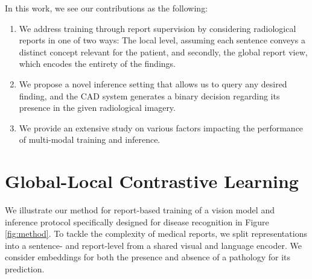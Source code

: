 \documentclass[runningheads]{llncs}
\begin{document}
In this work, we see our contributions as the following: 
\begin{enumerate}
    \item We address training through report supervision by considering radiological reports in one of two ways: The local level, assuming each sentence conveys a distinct concept relevant for the patient, and secondly, the global report view, which encodes the entirety of the findings.
    \item We propose a novel inference setting that allows us to query any desired finding, and the CAD system generates a binary decision regarding its presence in the given radiological imagery.
    \item We provide an extensive study on various factors impacting the performance of multi-modal training and inference.
\end{enumerate}
 

 

\iffalse

https://arxiv.org/pdf/2010.08670.pdf
https://arxiv.org/pdf/1901.07441.pdf
https://arxiv.org/abs/2011.10566
https://papers.nips.cc/paper/2020/file/d89a66c7c80a29b1bdbab0f2a1a94af8-Paper.pdf
https://arxiv.org/pdf/2201.11736.pdf
https://openaccess.thecvf.com/content_CVPR_2020/papers/He_Momentum_Contrast_for_Unsupervised_Visual_Representation_Learning_CVPR_2020_paper.pdf
https://openaccess.thecvf.com/content/CVPR2021W/ECV/papers/Cheng_Data-Efficient_Language-Supervised_Zero-Shot_Learning_With_Self-Distillation_CVPRW_2021_paper.pdf
https://proceedings.neurips.cc/paper/2021/file/505259756244493872b7709a8a01b536-Paper.pdf
https://proceedings.neurips.cc/paper/2020/file/d27b95cac4c27feb850aaa4070cc4675-Paper.pdf
https://arxiv.org/pdf/2006.13979.pdf
https://arxiv.org/abs/2011.02803
https://arxiv.org/pdf/2103.00020.pdf
https://arxiv.org/pdf/2112.12750.pdf
https://arxiv.org/pdf/2011.01403.pdf
https://arxiv.org/pdf/2201.11736.pdf
https://proceedings.mlr.press/v158/endo21a/endo21a.pdf
https://arxiv.org/pdf/2010.00747.pdf
https://proceedings.neurips.cc/paper/2020/file/d89a66c7c80a29b1bdbab0f2a1a94af8-Paper.pdf
https://arxiv.org/pdf/2112.02889.pdf
https://arxiv.org/pdf/1912.06430.pdf
https://arxiv.org/pdf/2110.05208.pdf
https://arxiv.org/pdf/2111.03930.pdf
https://arxiv.org/pdf/2111.14745.pdf
\fi \section{Global-Local Contrastive Learning}
We illustrate our method for report-based training of a vision model and inference protocol specifically designed for disease recognition in Figure \ref{fig:method}.
To tackle the complexity of medical reports, we split representations into a sentence- and report-level from a shared visual and language encoder. We consider embeddings for both the presence and absence of a pathology for its prediction. 
\end{document}
